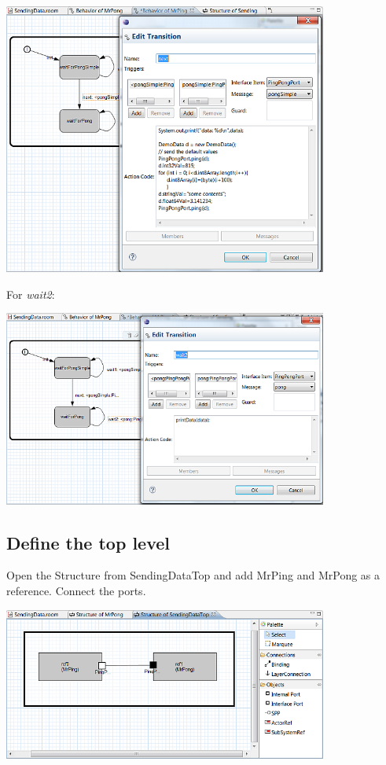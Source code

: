 \includegraphics[width=0.8\textwidth]{images/025-SendingData11.png}

For \textit{wait2}:

\includegraphics[width=0.8\textwidth]{images/025-SendingData12.png}

\subsection{Define the top level}

Open the Structure from SendingDataTop and add MrPing and MrPong as a reference. Connect the ports.

\includegraphics[width=0.8\textwidth]{images/025-SendingData13.png}

